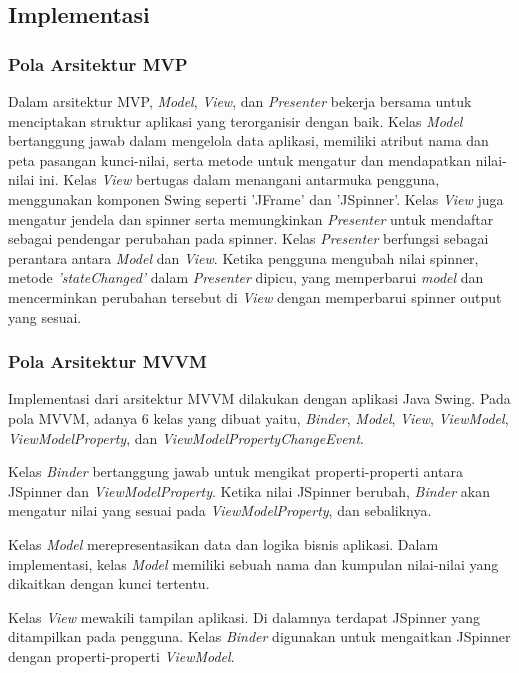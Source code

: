 \documentclass[conference]{IEEEtran}
\begin{document}
	\subsection{Implementasi}
	\subsubsection{Pola Arsitektur MVP}
	Dalam arsitektur MVP, \textit{Model}, \textit{View}, dan \textit{Presenter} bekerja bersama untuk menciptakan struktur aplikasi yang terorganisir dengan baik. Kelas \textit{Model} bertanggung jawab dalam mengelola data aplikasi, memiliki atribut nama dan peta pasangan kunci-nilai, serta metode untuk mengatur dan mendapatkan nilai-nilai ini. Kelas \textit{View} bertugas dalam menangani antarmuka pengguna, menggunakan komponen Swing seperti 'JFrame' dan 'JSpinner'. Kelas \textit{View} juga mengatur jendela dan spinner serta memungkinkan \textit{Presenter} untuk mendaftar sebagai pendengar perubahan pada spinner. Kelas \textit{Presenter} berfungsi sebagai perantara antara \textit{Model} dan \textit{View}. Ketika pengguna mengubah nilai spinner, metode \textit{'stateChanged'} dalam \textit{Presenter} dipicu, yang memperbarui \textit{model} dan mencerminkan perubahan tersebut di \textit{View} dengan memperbarui spinner output yang sesuai.
	
	\subsubsection{Pola Arsitektur MVVM}
	Implementasi dari arsitektur MVVM dilakukan dengan aplikasi Java Swing. Pada pola MVVM, adanya 6 kelas yang dibuat yaitu, \textit{Binder}, \textit{Model}, \textit{View}, \textit{ViewModel}, \textit{ViewModelProperty}, dan \textit{ViewModelPropertyChangeEvent}.
	
	Kelas \textit{Binder} bertanggung jawab untuk mengikat properti-properti antara JSpinner dan \textit{ViewModelProperty}. Ketika nilai JSpinner berubah, \textit{Binder} akan mengatur nilai yang sesuai pada \textit{ViewModelProperty}, dan sebaliknya.
	
	Kelas \textit{Model} merepresentasikan data dan logika bisnis aplikasi. Dalam implementasi, kelas \textit{Model} memiliki sebuah nama dan kumpulan nilai-nilai yang dikaitkan dengan kunci tertentu.
	
	Kelas \textit{View} mewakili tampilan aplikasi. Di dalamnya terdapat JSpinner yang ditampilkan pada pengguna. Kelas \textit{Binder} digunakan untuk mengaitkan JSpinner dengan properti-properti \textit{ViewModel}.
	
\end{document}
